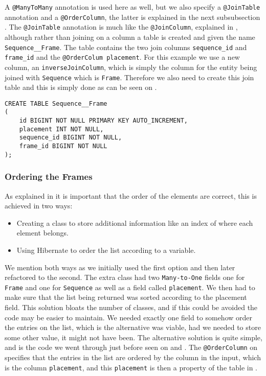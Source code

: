 A \texttt{@ManyToMany} annotation is used here as well, but we also specify a \texttt{@JoinTable} annotation and a \texttt{@OrderColumn}, the latter is explained in the next subsubsection .
The \texttt{@JoinTable} annotation is much like the \texttt{@JoinColumn}, explained in , although rather than joining on a column a table is created and given the name \texttt{Sequence\_\_Frame}.
The table contains the two join columns \texttt{sequence\_id} and \texttt{frame\_id} and the \texttt{@OrderColum placement}.
For this example we use a new column, an \texttt{inverseJoinColumn}, which is simply the column for the entity being joined with \texttt{Sequence} which is \texttt{Frame}.
Therefore we also need to create this join table and this is simply done as can be seen on .

\begin{lstlisting}[float, floatplacement=h, caption={The table creation of the join table between \texttt{Sequence} and \texttt{Frame}.},label={lst:sql-frame-sequence}]
CREATE TABLE Sequence__Frame
(
    id BIGINT NOT NULL PRIMARY KEY AUTO_INCREMENT,
    placement INT NOT NULL,
    sequence_id BIGINT NOT NULL,
    frame_id BIGINT NOT NULL
);
\end{lstlisting}

\subsubsection{Ordering the Frames}\label{ss:order}
As explained in  it is important that the order of the elements are correct, this is achieved in two ways:
\begin{itemize}
	\item Creating a class to store additional information like an index of where each element belongs.
	\item Using Hibernate to order the list according to a variable.
\end{itemize}

We mention both ways as we initially used the first option and then later refactored to the second.
The extra class had two \texttt{Many-to-One} fields one for \texttt{Frame} and one for \texttt{Sequence} as well as a field called \texttt{placement}.
We then had to make sure that the list being returned was sorted according to the placement field.
This solution bloats the number of classes, and if this could be avoided the code may be easier to maintain.
We needed exactly one field to somehow order the entries on the list, which is the alternative was viable, had we needed to store some other value, it might not have been.
The alternative solution is quite simple, and is the code we went through just before seen on  and .
The \texttt{@OrderColumn} on  specifies that the entries in the list are ordered by the column in the input, which is the column \texttt{placement}, and this \texttt{placement} is then a property of the table in .
